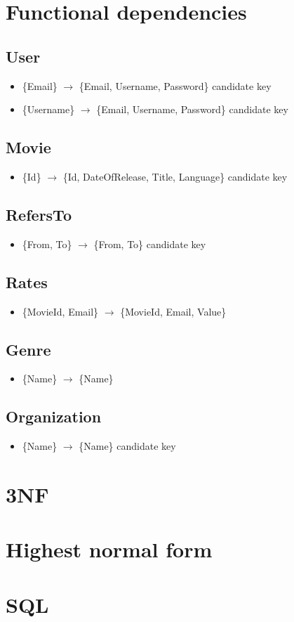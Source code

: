 \section{Functional dependencies}

\subsection*{User}
\begin{itemize}
\item{\{Email\} $\rightarrow$ \{Email, Username, Password\}} candidate key
\item{\{Username\} $\rightarrow$ \{Email, Username, Password\} candidate key}
\end{itemize}

\subsection*{Movie}
\begin{itemize}
\item{\{Id\} $\rightarrow$ \{Id, DateOfRelease, Title, Language\} candidate key}
\end{itemize}

\subsection*{RefersTo}
\begin{itemize}
\item{\{From, To\} $\rightarrow$ \{From, To\} candidate key}
\end{itemize}

\subsection*{Rates}
\begin{itemize}
\item \{MovieId, Email\} $\rightarrow$ \{MovieId, Email, Value\}
\end{itemize}

\subsection*{Genre}
\begin{itemize}
\item \{Name\} $\rightarrow$ \{Name\}
\end{itemize}

\subsection*{Organization}
\begin{itemize}
\item{\{Name\} $\rightarrow$ \{Name\} candidate key}
\end{itemize}

\section{3NF}

\section{Highest normal form}

\section{SQL}